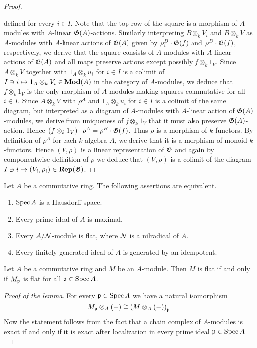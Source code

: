 \begin{proof}
\begin{center}
\end{center}
defined for every $i\in I$. Note that the top row of the square is a morphism of $A$-modules with $A$-linear ${\mathfrak G}(A)$-actions. Similarly interpreting $B\otimes_kV_i$ and $B\otimes_kV$ as $A$-modules with $A$-linear actions of ${\mathfrak G}(A)$ given by $\rho^B_i\cdot {\mathfrak G}(f)$ and $\rho^B\cdot {\mathfrak G}(f)$, respectively, we derive that the square consists of $A$-modules with $A$-linear actions of ${\mathfrak G}(A)$ and all maps preserve actions except possibly $f\otimes_k1_V$. Since $A\otimes_kV$ together with $1_A\otimes_ku_i$ for $i\in I$ is a colimit of $I\ni i \mapsto 1_A\otimes_kV_i\in \mathbf{Mod}(A)$ in the category of $A$-modules, we deduce that $f\otimes_k1_V$ is the only morphism of $A$-modules making squares commutative for all $i\in I$. Since $A\otimes_kV$ with $\rho^A$ and $1_A\otimes_k u_i$ for $i\in I$ is a colimit of the same diagram, but interpreted as a diagram of $A$-modules with $A$-linear action of ${\mathfrak G}(A)$-modules, we derive from uniqueness of $f\otimes_k1_V$ that it must also preserve ${\mathfrak G}(A)$-action. Hence $\left(f\otimes_k1_V\right)\cdot \rho^A = \rho^B\cdot {\mathfrak G}(f)$. Thus $\rho$ is a morphism of $k$-functors. By definition of $\rho^A$ for each $k$-algebra $A$, we derive that it is a morphism of monoid $k$-functors. Hence $(V,\rho)$ is a linear representation of ${\mathfrak G}$ and again by componentwise definition of $\rho$ we deduce that $(V,\rho)$ is a colimit of the diagram $I\ni i\mapsto (V_i,\rho_i)\in \mathbf{Rep}({\mathfrak G})$. 
\end{proof}

\begin{theorem}
Let $A$ be a commutative ring. The following assertions are equivalent.
\begin{enumerate}[label=\emph{\textbf{(\roman*)}}, leftmargin=3.0em]
\item $\mathrm{Spec}\, A$ is a Hausdorff space.
\item Every prime ideal of $A$ is maximal.
\item Every $A/{\mathcal N}$-module is flat, where ${\mathcal N}$ is a nilradical of $A$.
\item Every finitely generated ideal of $A$ is generated by an idempotent.
\end{enumerate}
\end{theorem}

\begin{lemma}\label{lemma:flatness_in_stalks}
Let $A$ be a commutative ring and $M$ be an $A$-module. Then $M$ is flat if and only if $M_{\mathfrak{p}}$ is flat for all $\mathfrak{p}\in \mathrm{Spec}\, A$.
\end{lemma}
\begin{proof}[Proof of the lemma]
For every $\mathfrak{p}\in \mathrm{Spec}\, A$ we have a natural isomorphism
$$M_{\mathfrak{p}}\otimes_A(-) \cong \left(M\otimes_A(-)\right)_{\mathfrak{p}}$$
Now the statement follows from the fact that a chain complex of $A$-modules is exact if and only if it is exact after localization in every prime ideal $\mathfrak{p}\in \mathrm{Spec}\, A$
\end{proof}

